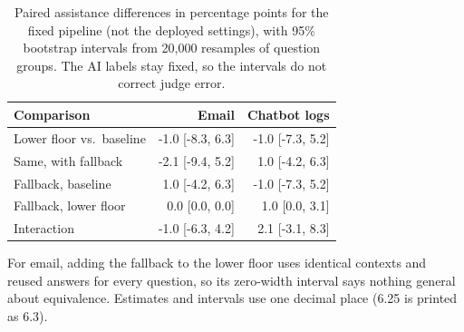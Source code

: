\begin{table}[t]
\centering\footnotesize
\setlength{\tabcolsep}{3pt}
\caption{Paired assistance differences in percentage points for the fixed pipeline (not the deployed settings), with 95\% bootstrap intervals from 20,000 resamples of question groups. The AI labels stay fixed, so the intervals do not correct judge error.}
\label{tab:luna-effects}
\begin{tabular}{lrr}
\toprule
Comparison & Email & Chatbot logs \\
\midrule
Lower floor vs.\ baseline & -1.0 [-8.3, 6.3] & -1.0 [-7.3, 5.2] \\
Same, with fallback & -2.1 [-9.4, 5.2] & 1.0 [-4.2, 6.3] \\
Fallback, baseline & 1.0 [-4.2, 6.3] & -1.0 [-7.3, 5.2] \\
Fallback, lower floor & 0.0 [0.0, 0.0] & 1.0 [0.0, 3.1] \\
Interaction & -1.0 [-6.3, 4.2] & 2.1 [-3.1, 8.3] \\
\bottomrule
\end{tabular}
\par\smallskip\begin{minipage}{0.98\columnwidth}\footnotesize For email, adding the fallback to the lower floor uses identical contexts and reused answers for every question, so its zero-width interval says nothing general about equivalence. Estimates and intervals use one decimal place (6.25 is printed as 6.3).\end{minipage}
\end{table}

